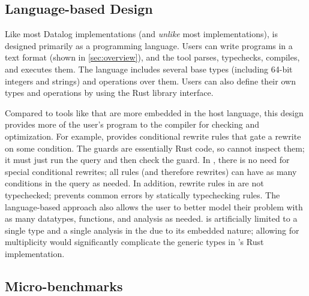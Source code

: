 

\subsection{Language-based Design}

Like most Datalog implementations (and \emph{unlike} most \eqsat implementations),
 \egglog is designed primarily as a programming language.
Users can write \egglog programs in a text format 
 (shown in \autoref{sec:overview}),
 and the tool parses, typechecks, compiles, and executes them.
The \egglog language includes 
 several base types (including 64-bit integers and strings)
 and operations over them.
Users can also define their own types and operations
 by using the Rust library interface.

Compared to tools like \egg
 that are more embedded in the host language,
 this design provides more
 of the user's program to the compiler for 
 checking and optimization.
For example,
 \egg provides conditional rewrite rules
 that gate a rewrite on some condition. 
The guards are essentially Rust code,
 so \egg cannot inspect them;
 it must just run the query and then check the guard.
In \Egglog, 
 there is no need for special conditional rewrites;
 all rules (and therefore rewrites) 
 can have as many conditions in the query as needed.
In addition,
 rewrite rules in \egg are not typechecked;
 \egglog prevents common errors by statically typechecking rules.
The language-based approach also allows
 the user to better model their problem
 with as many datatypes, functions, and analysis as needed.
\egg is artificially limited 
 to a single type and a single analysis in the \egraph
 due to its embedded nature;
 allowing for multiplicity would 
 significantly complicate
 the generic types in \egg's Rust implementation.
 

\subsection{Micro-benchmarks}


